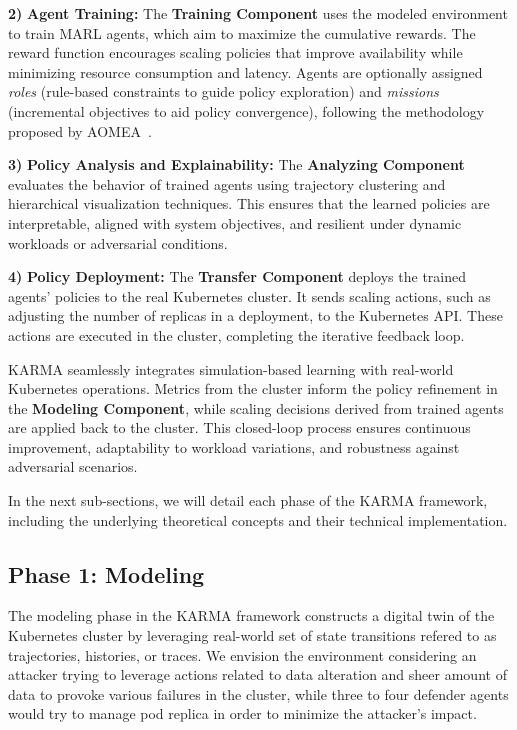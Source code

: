 \documentclass[conference]{IEEEtran}
\begin{document}
\textbf{2)} \textbf{Agent Training:} The \textbf{Training Component} uses the modeled environment to train MARL agents, which aim to maximize the cumulative rewards. The reward function encourages scaling policies that improve availability while minimizing resource consumption and latency. Agents are optionally assigned \textit{roles} (rule-based constraints to guide policy exploration) and \textit{missions} (incremental objectives to aid policy convergence), following the methodology proposed by AOMEA~\cite{soule2024aomea}.
    
\textbf{3)} \textbf{Policy Analysis and Explainability:} The \textbf{Analyzing Component} evaluates the behavior of trained agents using trajectory clustering and hierarchical visualization techniques. This ensures that the learned policies are interpretable, aligned with system objectives, and resilient under dynamic workloads or adversarial conditions.
    
\textbf{4)} \textbf{Policy Deployment:} The \textbf{Transfer Component} deploys the trained agents' policies to the real Kubernetes cluster. It sends scaling actions, such as adjusting the number of replicas in a deployment, to the Kubernetes API. These actions are executed in the cluster, completing the iterative feedback loop.

KARMA seamlessly integrates simulation-based learning with real-world Kubernetes operations. Metrics from the cluster inform the policy refinement in the \textbf{Modeling Component}, while scaling decisions derived from trained agents are applied back to the cluster. This closed-loop process ensures continuous improvement, adaptability to workload variations, and robustness against adversarial scenarios.

In the next sub-sections, we will detail each phase of the KARMA framework, including the underlying theoretical concepts and their technical implementation.

\subsection{Phase 1: Modeling}

The modeling phase in the KARMA framework constructs a digital twin of the Kubernetes cluster by leveraging real-world set of state transitions refered to as trajectories, histories, or traces. We envision the environment considering an attacker trying to leverage actions related to data alteration and sheer amount of data to provoke various failures in the cluster, while three to four defender agents would try to manage pod replica in order to minimize the attacker's impact.
\end{document}
